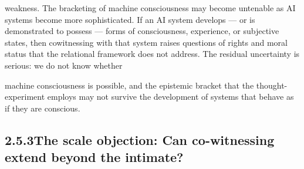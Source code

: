 weakness. The bracketing of machine consciousness may become untenable as AI systems become more sophisticated. If an AI system develops — or is demonstrated to possess — forms of consciousness, experience, or subjective states, then cowitnessing with that system raises questions of rights and moral status that the relational framework does not address. The residual uncertainty is serious: we do not know whether

machine consciousness is possible, and the epistemic bracket that the thought-experiment employs may not survive the development of systems that behave as if they are conscious.

\subsection{2.5.3\quad The scale objection: Can co-witnessing extend beyond the intimate?}

